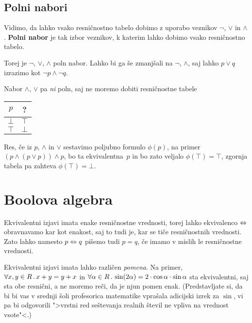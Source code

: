 \subsection{Polni nabori}
\label{sec:polni-nabori}

Vidimo, da lahko vsako resničnostno tabelo dobimo z uporabo veznikov $\neg$, $\lor$ in
$\land$. \textbf{Polni nabor} je tak izbor veznikov, k katerim lahko dobimo vsako
resničnostno tabelo.

Torej je $\neg$, $\lor$, $\land$ poln nabor. Lahko bi ga še zmanjšali na $\neg$, $\land$, saj lahko $p \lor q$ izrazimo kot $\neg p \land \neg q$.

Nabor $\land$, $\lor$ pa \emph{ni} poln, saj ne moremo dobiti resničnostne tabele
%
\begin{center}
  \begin{tabular}{cc}
    \toprule
    $p$ & ? \\ \midrule
    $\bot$ & $\top$ \\
    $\top$ & $\bot$ \\
    \bottomrule
  \end{tabular}
\end{center}
%
Res, če iz $p$, $\land$ in $\lor$ sestavimo poljubno formulo $\phi(p)$, na primer $(p \land (p \lor p)) \land p$, bo ta ekvivalentna~$p$ in bo zato veljalo $\phi(\top) = \top$, zgornja tabela pa zahteva $\phi(\top) = \bot$.


\section{Boolova algebra}

Ekvivalentni izjavi imata enake resničnostne vrednosti, torej lahko ekvivalenco
$\Leftrightarrow$ obravnavamo kar kot enakost, saj to tudi je, kar se tiče resničnostnih
vrednosti. Zato lahko namesto $p \Leftrightarrow q$ pišemo tudi $p = q$, če imamo v mislih le
resničnostne vrednosti.

\begin{opomba}
  Ekvivalentni izjavi imata lahko različen \emph{pomena}. Na primer,
  $\forall x, y \in R \,.\, x + y = y + x$ in
  $\forall \alpha \in R \,.\, \sin(2 \alpha) = 2 \cdot \cos \alpha \cdot \sin \alpha$ sta
  ekvivalentni, saj sta obe resnični, a ne moremo reči, da je njun pomen enak. (Predstavljate si, da bi bi vas v srednji šoli profesorica matematike vprašala adicijski izrek za $\sin$, vi pa bi odgovorili ">vrstni red seštevanja realnih števil ne vpliva na vrednost vsote"<.)
\end{opomba}


